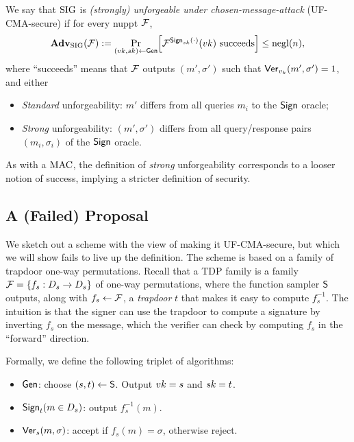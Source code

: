 \documentclass[11pt]{article}
\begin{document}
\begin{definition}
  \label{def:uf-cma-sig}
  We say that $\text{SIG}$ is \emph{(strongly) unforgeable under
    chosen-message-attack} (UF-CMA-secure) if for every nuppt $\mathcal{F}$,
  \[ \advan_{\sig}(\For) := \Pr_{(\vk,\sk) \gets \siggen}
  \bracks*{\For^{\sigsign_{\sk}(\cdot)}(\vk) \text{ succeeds}} \leq
  \negl(n), \] where ``succeeds'' means that $\mathcal{F}$ outputs $(m' ,
  \sigma')$ such that $\mathsf{Ver}_{v_{k}}(m' , \sigma') = 1$, and either
  \begin{itemize}
  \item \emph{Standard} unforgeability: $m'$ differs from all queries
    $m_{i}$ to the $\mathsf{Sign}$ oracle;
  \item \emph{Strong} unforgeability: $(m', \sigma')$ differs from all
    query/response pairs $(m_{i}, \sigma_{i})$ of the $\mathsf{Sign}$
    oracle.
  \end{itemize}
\end{definition}

As with a $\text{MAC}$, the definition of \emph{strong} unforgeability
corresponds to a looser notion of success, implying a stricter
definition of security.

\subsection{A (Failed) Proposal}
\label{sec:failed-proposal}

We sketch out a scheme with the view of making it UF-CMA-secure, but
which we will show fails to live up the definition.  The scheme is
based on a family of trapdoor one-way permutations.  Recall that a TDP
family is a family $\mathcal{F} = \{f_{s} : D_{s} \to D_{s}\}$ of one-way
permutations, where the function sampler $\mathsf{S}$ outputs, along
with $f_{s} \gets \mathcal{F}$, a \emph{trapdoor} $t$ that makes it easy to
compute $f_{s}^{-1}$.  The intuition is that the signer can use the
trapdoor to compute a signature by inverting $f_{s}$ on the message,
which the verifier can check by computing $f_{s}$ in the ``forward''
direction.

Formally, we define the following triplet of algorithms:
\begin{itemize}
\item $\mathsf{Gen}$: choose $(s,t) \gets \mathsf{S}$.  Output $vk = s$ and
  $sk = t$. 
\item $\mathsf{Sign}_{t} (m \in D_{s})$: output $f_{s}^{-1}(m)$.
\item $\mathsf{Ver}_{s}(m , \sigma)$: accept if $f_{s}(m) = \sigma$,
  otherwise reject.
\end{itemize}
\end{document}
